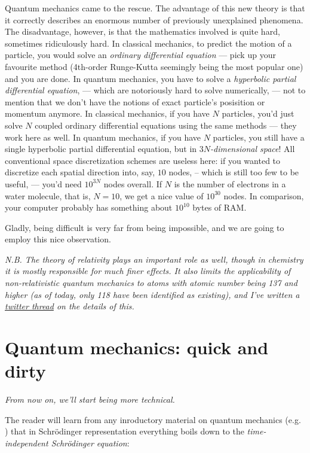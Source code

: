 \documentclass{article}
\begin{document}
Quantum mechanics came to the rescue. The advantage of this new theory is that it correctly describes an enormous number of previously unexplained phenomena. The disadvantage, however, is that the mathematics involved is quite hard, sometimes ridiculously hard. In classical mechanics, to predict the motion of a particle, you would solve an \textit{ordinary differential equation} --- pick up your favourite method (4th-order Runge-Kutta seemingly being the most popular one) and you are done. In quantum mechanics, you have to solve a \textit{hyperbolic partial differential equation}, --- which are notoriously hard to solve numerically, --- not to mention that we don't have the notions of exact particle's posisition or momentum anymore. In classical mechanics, if you have \(N\) particles, you'd just solve \(N\) coupled ordinary differential equations using the same methods --- they work here as well. In quantum mechanics, if you have \(N\) particles, you still have a single hyperbolic partial differential equation, but in \textit{\(3N\)-dimensional space}! All conventional space discretization schemes are useless here: if you wanted to discretize each spatial direction into, say, \(10\) nodes, -- which is still too few to be useful, --- you'd need \(10^{3N}\) nodes overall. If \(N\) is the number of electrons in a water molecule, that is, \(N=10\), we get a nice value of \(10^{30}\) nodes. In comparison, your computer probably has something about \(10^{10}\) bytes of RAM.

Gladly, being difficult is very far from being impossible, and we are going to employ this nice observation.

\textit{N.B. The theory of relativity plays an important role as well, though in chemistry it is mostly responsible for much finer effects. It also limits the applicability of non-relativistic quantum mechanics to atoms with atomic number being 137 and higher (as of today, only 118 have been identified as existing), and I've written a \href{https://twitter.com/lisyarus/status/1189227697605660673?s=20}{twitter thread} on the details of this.}

\newpage

\section{Quantum mechanics: quick and dirty} \label{sec:qm}

\textit{From now on, we'll start being more technical.}

The reader will learn from any inroductory material on quantum mechanics (e.g. \cite{ref:atkins}) that in Schrödinger representation everything boils down to the \textit{time-independent Schrödinger equation}:
\end{document}
